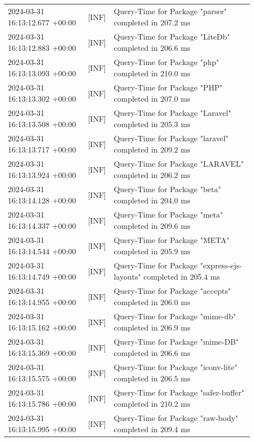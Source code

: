 {{\begin{tabularx}{\textwidth}{|l|l|X|}
                    2024-03-31 16:13:12.677 +00:00 & [INF] & Query-Time for Package "parser" completed in 207.2 ms \\
                    2024-03-31 16:13:12.883 +00:00 & [INF] & Query-Time for Package "LiteDb" completed in 206.6 ms \\
                    2024-03-31 16:13:13.093 +00:00 & [INF] & Query-Time for Package "php" completed in 210.0 ms \\
                    2024-03-31 16:13:13.302 +00:00 & [INF] & Query-Time for Package "PHP" completed in 207.0 ms \\
                    2024-03-31 16:13:13.508 +00:00 & [INF] & Query-Time for Package "Laravel" completed in 205.3 ms \\
                    2024-03-31 16:13:13.717 +00:00 & [INF] & Query-Time for Package "laravel" completed in 209.2 ms \\
                    2024-03-31 16:13:13.924 +00:00 & [INF] & Query-Time for Package "LARAVEL" completed in 206.2 ms \\
                    2024-03-31 16:13:14.128 +00:00 & [INF] & Query-Time for Package "beta" completed in 204.0 ms \\
                    2024-03-31 16:13:14.337 +00:00 & [INF] & Query-Time for Package "meta" completed in 209.6 ms \\
                    2024-03-31 16:13:14.544 +00:00 & [INF] & Query-Time for Package "META" completed in 205.9 ms \\
                    2024-03-31 16:13:14.749 +00:00 & [INF] & Query-Time for Package "express-ejs-layouts" completed in 205.4 ms \\
                    2024-03-31 16:13:14.955 +00:00 & [INF] & Query-Time for Package "accepts" completed in 206.0 ms \\
                    2024-03-31 16:13:15.162 +00:00 & [INF] & Query-Time for Package "mime-db" completed in 206.9 ms \\
                    2024-03-31 16:13:15.369 +00:00 & [INF] & Query-Time for Package "mime-DB" completed in 206.6 ms \\
                    2024-03-31 16:13:15.575 +00:00 & [INF] & Query-Time for Package "iconv-lite" completed in 206.5 ms \\
                    2024-03-31 16:13:15.786 +00:00 & [INF] & Query-Time for Package "safer-buffer" completed in 210.2 ms \\
                    2024-03-31 16:13:15.995 +00:00 & [INF] & Query-Time for Package "raw-body" completed in 209.4 ms \\

\end{tabularx}}}
